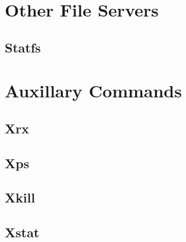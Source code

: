 \documentclass[draft]{article}
\begin{document}
\section{Other File Servers}
\subsection{Statfs}

\section{Auxillary Commands}

\subsection{Xrx}

\subsection{Xps}

\subsection{Xkill}
\subsection{Xstat}
\end{document}
